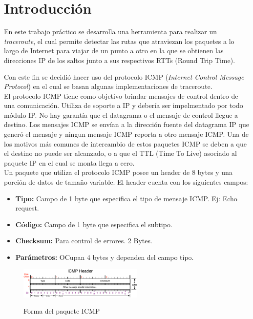 \section{Introducción}

En este trabajo práctico se desarrolla una herramienta para realizar un \textit{traceroute}, el cual permite detectar las rutas que atraviezan los paquetes a lo largo de Internet para viajar de un punto a otro en la que se obtienen las direcciones IP de los saltos junto a sus respectivos RTTs (Round Trip Time).

Con este fin se decidió hacer uso del protocolo ICMP (\textit{Internet Control Message Protocol}) en el cual se basan algunas implementaciones de traceroute.\\

El protocolo ICMP tiene como objetivo brindar mensajes de control dentro de una comunicación\cite{ICMP}. Utiliza de soporte a IP y debería ser impelmentado por todo módulo IP. No hay garantía que el datagrama o el mensaje de control llegue a destino. Los mensajes ICMP se envían a la dirección fuente del datagrama IP que generó el mensaje y ningun mensaje ICMP reporta a otro mensaje ICMP. Una de los motivos más comunes de intercambio de estos paquetes ICMP se deben a que el destino no puede ser alcanzado, o a que el TTL (Time To Live) asociado al paquete IP en el cual se monta llega a cero.\\

Un paquete que utiliza el protocolo ICMP posee un header de 8 bytes y una porción de datos de tamaño variable. El header cuenta con los siguientes campos: 

\begin{itemize}
\item \textbf{Tipo:} Campo de 1 byte que especifica el tipo de mensaje ICMP. Ej: Echo request.
\item \textbf{Código:} Campo de 1 byte que especifica el subtipo.
\item \textbf{Checksum:} Para control de errores. 2 Bytes.
\item \textbf{Parámetros:} OCupan 4 bytes y dependen del campo tipo.
\end{itemize}

\begin{figure}[H]
\centering
\caption{Forma del paquete ICMP}
\includegraphics[width=0.55\textwidth]{modules/ICMP-Header.png}
 \label{fig:Header_ICMP}
\end{figure}

